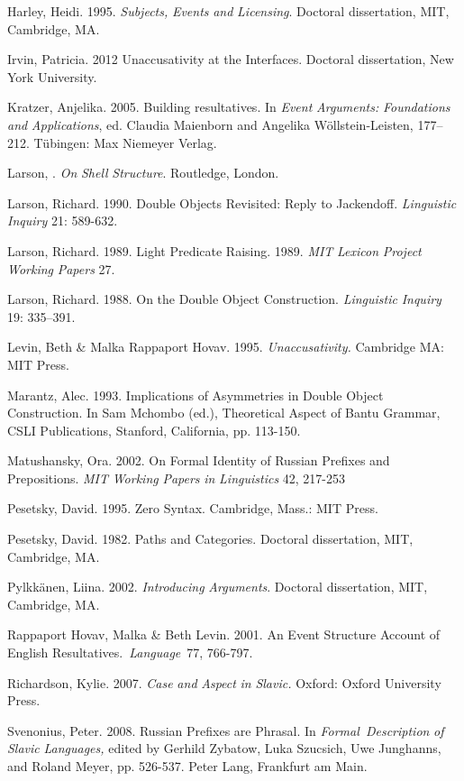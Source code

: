 \documentclass[output=paper,modfonts, nonflat]{langsci/langscibook}
\begin{document}
Harley, Heidi. 1995. \textit{Subjects,} \textit{Events} \textit{and} \textit{Licensing}. Doctoral dissertation, MIT, Cambridge, MA. 

Irvin, Patricia. 2012 Unaccusativity at the Interfaces. Doctoral dissertation, New York University.

Kratzer, Anjelika. 2005. Building resultatives. In \textit{Event} \textit{Arguments:} \textit{Foundations} \textit{and} \textit{Applications}, ed. Claudia Maienborn and Angelika Wöllstein-Leisten, 177– 212. Tübingen: Max Niemeyer Verlag.

Larson, \citealt{Richard2014}. \textit{On} \textit{Shell} \textit{Structure}. Routledge, London.

Larson, Richard. 1990. Double Objects Revisited: Reply to Jackendoff. \textit{Linguistic} \textit{Inquiry} 21: 589-632.

Larson, Richard. 1989. Light Predicate Raising. 1989. \textit{MIT} \textit{Lexicon} \textit{Project} \textit{Working} \textit{Papers} 27. 

Larson, Richard. 1988. On the Double Object Construction. \textit{Linguistic} \textit{Inquiry} 19: 335–391. 

Levin, Beth \& Malka Rappaport Hovav. 1995. \textit{Unaccusativity.} Cambridge MA: MIT Press.

Marantz, Alec. 1993. Implications of Asymmetries in Double Object Construction. In Sam Mchombo (ed.), Theoretical Aspect of Bantu Grammar, CSLI Publications, Stanford, California, pp. 113-150. 

Matushansky, Ora. 2002. On Formal Identity of Russian Prefixes and Prepositions. \textit{MIT} \textit{Working} \textit{Papers} \textit{in} \textit{Linguistics} 42, 217-253

Pesetsky, David. 1995. Zero Syntax. Cambridge, Mass.: MIT Press.

Pesetsky, David. 1982. Paths and Categories. Doctoral dissertation, MIT, Cambridge, MA.

Pylkkänen, Liina. 2002. \textit{Introducing} \textit{Arguments}. Doctoral dissertation, MIT, Cambridge, MA. 

Rappaport Hovav, Malka \& Beth Levin. 2001. An Event Structure Account of English Resultatives.~\textit{Language}~77, 766-797.

Richardson, Kylie. 2007. \textit{Case} \textit{and} \textit{Aspect} \textit{in} \textit{Slavic.} Oxford: Oxford University Press. 

Svenonius, Peter. 2008. Russian Prefixes are Phrasal. In \textit{Formal~Description} \textit{of} \textit{Slavic} \textit{Languages,} edited by Gerhild Zybatow, Luka Szucsich, Uwe Junghanns, and Roland Meyer, pp. 526-537. Peter Lang, Frankfurt am Main. 
\end{document}
